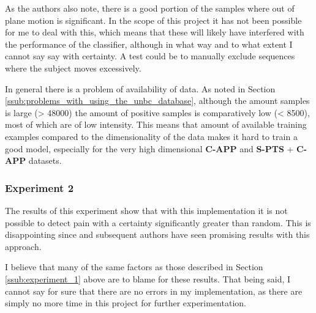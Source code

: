 \documentclass[Main]{subfiles}
\begin{document}
			As the authors also note, there is a good portion of the samples where out of plane motion is significant.
			In the scope of this project it has not been possible for me to deal with this, which means that these will likely have interfered with the performance of the classifier, although in what way and to what extent I cannot say say with certainty.
			A test could be to manually exclude sequences where the subject moves excessively.

			In general there is a problem of availability of data.
			As noted in Section \ref{ssub:problems_with_using_the_unbc_database}, although the amount samples is large (> 48000) the amount of positive samples is comparatively low (< 8500), most of which are of low intensity.
			This means that amount of available training examples compared to the dimensionality of the data makes it hard to train a good model, especially for the very high dimensional \textbf{C-APP} and \textbf{S-PTS} + \textbf{C-APP} datasets.
			
		
		\subsubsection{Experiment 2} %
			\label{ssub:experiment_2}
			The results of this experiment show that with this implementation it is not possible to detect pain with a certainty significantly greater than random.
			This is disappointing since \cite{Lucey2011} and subsequent authors have seen promising results with this approach.

			I believe that many of the same factors as those described in Section \ref{ssub:experiment_1} above are to blame for these results.
			That being said, I cannot say for sure that there are no errors in my implementation, as there are simply no more time in this project for further experimentation.			



\end{document}
